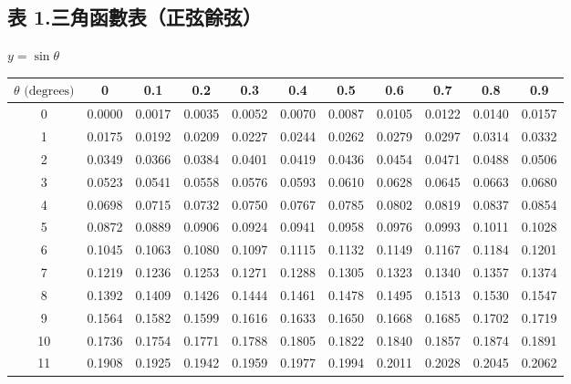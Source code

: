 \subsection*{表 1.\quad 三角函數表（正弦餘弦）}
\begin{center} $y = \sin\theta$ \end{center}
{\centering\fontsize{7.5pt}{8.6pt}\selectfont\setlength{\tabcolsep}{3.5pt}\renewcommand{\arraystretch}{0.88}
\begin{tabular}{|c|cccccccccc|}
\hline
$\theta\text{ (degrees)}$ & 0 & 0.1 & 0.2 & 0.3 & 0.4 & 0.5 & 0.6 & 0.7 & 0.8 & 0.9 \\ \hline
0 & 0.0000 & 0.0017 & 0.0035 & 0.0052 & 0.0070 & 0.0087 & 0.0105 & 0.0122 & 0.0140 & 0.0157 \\
1 & 0.0175 & 0.0192 & 0.0209 & 0.0227 & 0.0244 & 0.0262 & 0.0279 & 0.0297 & 0.0314 & 0.0332 \\
2 & 0.0349 & 0.0366 & 0.0384 & 0.0401 & 0.0419 & 0.0436 & 0.0454 & 0.0471 & 0.0488 & 0.0506 \\
3 & 0.0523 & 0.0541 & 0.0558 & 0.0576 & 0.0593 & 0.0610 & 0.0628 & 0.0645 & 0.0663 & 0.0680 \\
4 & 0.0698 & 0.0715 & 0.0732 & 0.0750 & 0.0767 & 0.0785 & 0.0802 & 0.0819 & 0.0837 & 0.0854 \\
\hline
5 & 0.0872 & 0.0889 & 0.0906 & 0.0924 & 0.0941 & 0.0958 & 0.0976 & 0.0993 & 0.1011 & 0.1028 \\
6 & 0.1045 & 0.1063 & 0.1080 & 0.1097 & 0.1115 & 0.1132 & 0.1149 & 0.1167 & 0.1184 & 0.1201 \\
7 & 0.1219 & 0.1236 & 0.1253 & 0.1271 & 0.1288 & 0.1305 & 0.1323 & 0.1340 & 0.1357 & 0.1374 \\
8 & 0.1392 & 0.1409 & 0.1426 & 0.1444 & 0.1461 & 0.1478 & 0.1495 & 0.1513 & 0.1530 & 0.1547 \\
9 & 0.1564 & 0.1582 & 0.1599 & 0.1616 & 0.1633 & 0.1650 & 0.1668 & 0.1685 & 0.1702 & 0.1719 \\
\hline
10 & 0.1736 & 0.1754 & 0.1771 & 0.1788 & 0.1805 & 0.1822 & 0.1840 & 0.1857 & 0.1874 & 0.1891 \\
11 & 0.1908 & 0.1925 & 0.1942 & 0.1959 & 0.1977 & 0.1994 & 0.2011 & 0.2028 & 0.2045 & 0.2062 \\

\end{tabular}}
